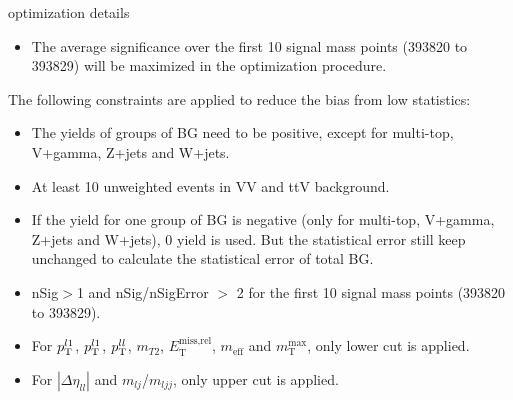 \documentclass[mathserif,serif]{beamer}
\begin{document}
\begin{frame}{optimization details}
\small
\begin{itemize}
\item The average significance over the first 10 signal mass points (393820 to 393829) will be maximized in the optimization procedure.
\end{itemize}
The following constraints are applied to reduce the bias from low statistics:
\begin{itemize}
\small
\item The yields of groups of BG need to be positive, except for multi-top, V+gamma, Z+jets and W+jets.
\item At least 10 unweighted events in VV and ttV background.
\item If the yield for one group of BG is negative (only for multi-top, V+gamma, Z+jets and W+jets), 0 yield is used. But the statistical error still keep unchanged to calculate the statistical error of total BG.
\item nSig$>$1 and nSig/nSigError $>$ 2 for the first 10 signal mass points (393820 to 393829).
\item For $p_{\text{T}}^{l1}$, $p_{\text{T}}^{l1}$, $p_{\text{T}}^{ll}$, $m_{T2}$, $E_{\text{T}}^{\text{miss,rel}}$, $m_{\text{eff}}$ and $m_{\text{T}}^{\text{max}}$, only lower cut is applied.
\item For $|\Delta\eta_{ll}|$ and $m_{lj}$/$m_{ljj}$, only upper cut is applied.
\end{itemize}
\end{frame}
\end{document}
